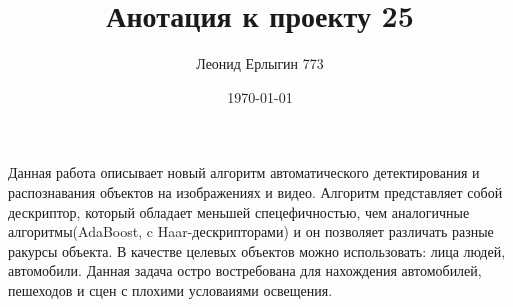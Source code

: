 \documentclass[a4paper,12pt]{article}
\author{Леонид Ерлыгин 773}
\title{Анотация к проекту 25}
\date{\today}
\begin{document}
\maketitle
\newpage
Данная работа описывает новый алгоритм автоматического детектирования и распознавания объектов на изображениях и видео. Алгоритм представляет собой дескриптор, который обладает меньшей спецефичностью, чем аналогичные алгоритмы(AdaBoost, c Haar-дескрипторами) и он позволяет различать разные ракурсы объекта. В качестве целевых объектов можно использовать: лица людей, автомобили. Данная задача остро востребована для нахождения автомобилей, пешеходов и сцен с плохими условаиями освещения.
\end{document}

